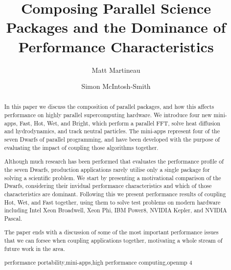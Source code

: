 \documentclass[runningheads,a4paper]{llncs}
\newcommand{\keywords}[1]{\par\addvspace\baselineskip
\noindent\keywordname\enspace\ignorespaces#1}
\begin{document}
\mainmatter  %

\title{Composing Parallel Science Packages and the Dominance of Performance Characteristics}


\author{Matt Martineau \and Simon McIntosh-Smith}
%


%
%

\maketitle


\begin{abstract}
  In this paper we discuss the composition of parallel packages, and how this affects performance on highly parallel supercomputing hardware. We introduce four new mini-apps, Fast, Hot, Wet, and Bright, which perform a parallel FFT, solve heat diffusion and hydrodynamics, and track neutral particles. The mini-apps represent four of the seven Dwarfs of parallel programming, and have been developed with the purpose of evaluating the impact of coupling those algorithms together.

  Although much research has been performed that evaluates the performance profile of the seven Dwarfs, production applications rarely utilise only a single package for solving a scientific problem. We start by presenting a motivational comparison of the Dwarfs, considering their invidual performance characteristics and which of those characteristics are dominant. Following this we present performance results of coupling Hot, Wet, and Fast together, using them to solve test problems on modern hardware including Intel Xeon Broadwell, Xeon Phi, IBM Power8, NVIDIA Kepler, and NVIDIA Pascal.

  The paper ends with a discussion of some of the most important performance issues that we can forsee when coupling applications together, motivating a whole stream of future work in the area.

\keywords{performance portability,mini-apps,high performance computing,openmp 4}
\end{abstract}
\end{document}
